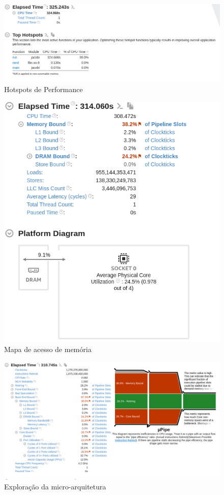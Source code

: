 \documentclass{article}
\begin{document}
\begin{figure}
    \centering
    \includegraphics[width=1\textwidth]{img/hs.png}
    \caption{Hotspots de Performance}
    \label{fig:enter-label}
\end{figure}

\begin{figure}
    \centering
    \includegraphics[width=1\textwidth]{img/macc.png}
    \caption{Mapa de acesso de memória}
    \label{fig:enter-label}
\end{figure}

\begin{figure}
    \centering
    \includegraphics[width=1\textwidth]{img/ue.png}
    \caption{Exploração da micro-arquitetura}
    \label{fig:enter-label}
\end{figure}
\end{document}
